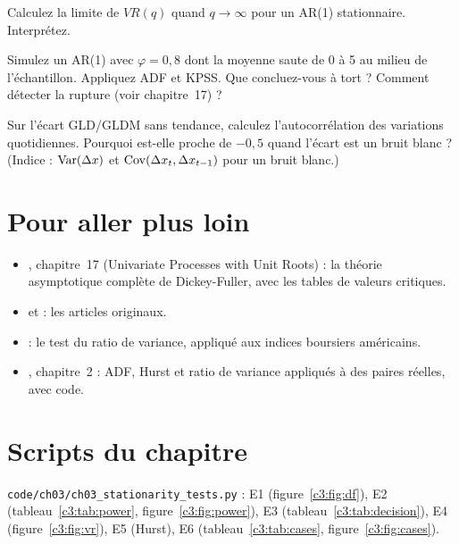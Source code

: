 \begin{exercise}
Calculez la limite de $VR(q)$ quand $q\to\infty$ pour un AR(1) stationnaire. Interprétez.
\end{exercise}

\begin{exercise}[à coder]
Simulez un AR(1) avec $\varphi = 0{,}8$ dont la moyenne saute de 0 à 5 au milieu de l'échantillon. Appliquez ADF et KPSS. Que concluez-vous à tort ? Comment détecter la rupture (voir chapitre~17) ?
\end{exercise}

\begin{exercise}[à coder]
Sur l'écart GLD/GLDM sans tendance, calculez l'autocorrélation des variations quotidiennes. Pourquoi est-elle proche de $-0{,}5$ quand l'écart est un bruit blanc ? (Indice : $\operatorname{Var}(\Delta x)$ et $\operatorname{Cov}(\Delta x_t,\Delta x_{t-1})$ pour un bruit blanc.)
\end{exercise}

\section{Pour aller plus loin}

\begin{toread}
\begin{itemize}[leftmargin=1.2em]
\item \citet{hamilton1994}, chapitre~17 (\og Univariate Processes with Unit Roots\fg) : la théorie asymptotique complète de Dickey-Fuller, avec les tables de valeurs critiques.
\item \citet{dickeyfuller1979} et \citet{kpss1992} : les articles originaux.
\item \citet{lomackinlay1988} : le test du ratio de variance, appliqué aux indices boursiers américains.
\item \citet{chan2013}, chapitre~2 : ADF, Hurst et ratio de variance appliqués à des paires réelles, avec code.
\end{itemize}
\end{toread}

\section{Scripts du chapitre}
\noindent\texttt{code/ch03/ch03\_stationarity\_tests.py} : E1 (figure~\ref{c3:fig:df}), E2 (tableau~\ref{c3:tab:power}, figure~\ref{c3:fig:power}), E3 (tableau~\ref{c3:tab:decision}), E4 (figure~\ref{c3:fig:vr}), E5 (Hurst), E6 (tableau~\ref{c3:tab:cases}, figure~\ref{c3:fig:cases}).
